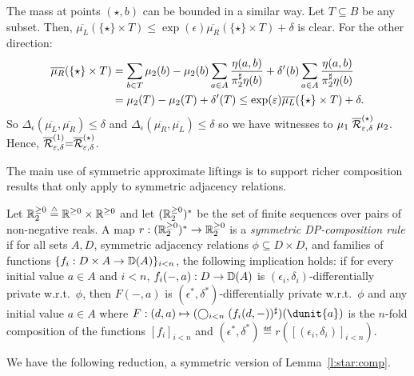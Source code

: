 \documentclass{lmcs}
\begin{document}
  The mass at points $(\star, b)$ can be bounded in a similar way. Let $T
  \subseteq B$ be any subset. Then, $\overline{\mu_L}(\{ \star \} \times T) \leq
  \exp(\epsilon) \overline{\mu_R}(\{ \star \} \times T) + \delta$ is clear. For
  the other direction:
  \begin{align*}
    \overline{\mu_R}(\{ \star \} \times T) &= \sum_{b \in T} \mu_2(b)
    - \mu_2(b) \sum_{a \in A} \frac{\eta(a, b)}{\pi_{2}^{\sharp} \eta(b)}
    + \delta'(b) \sum_{a \in A} \frac{\eta(a, b)}{\pi_{2}^{\sharp} \eta(b)} \\
    &= \mu_2(T) - \mu_2(T) + \delta'(T)
    \leq \exp(\varepsilon) \overline{\mu_L}(\{ \star \} \times T) + \delta .
  \end{align*}
  So $\Delta_{\epsilon}(\overline{\mu_L},\overline{\mu_R}) \leq \delta$ and
  $\Delta_{\epsilon}(\overline{\mu_R},\overline{\mu_L}) \leq \delta$ so we have
  witnesses to $\mu_1 \mathrel{\overline{\mathrel{\mathcal{R}}}^{(\star)}_{\varepsilon, \delta}} \mu_2$. Hence,
  $\mathrel{\overline{\mathrel{\mathcal{R}}}^{(1)}_{\varepsilon, \delta}} = \mathrel{\overline{\mathrel{\mathcal{R}}}^{(\star)}_{\varepsilon, \delta}}$.
\endproofatend

The main use of symmetric approximate liftings is to support richer composition
results that only apply to symmetric adjacency relations.

\begin{defi} \label{d:sym:comp:rule}
  Let $\mathbb{R}^{\geq 0}_2 \mathrel{\stackrel{\scriptscriptstyle \triangle}{=}} \mathbb{R}^{\geq 0} \times \mathbb{R}^{\geq 0}$ and let
  $(\mathbb{R}^{\geq 0}_2)^*$ be the set of finite sequences over pairs of non-negative
  reals. A map $r : (\mathbb{R}^{\geq 0}_2)^* \to \mathbb{R}^{\geq 0}_2$ is a
  \emph{symmetric DP-composition rule} if for all sets $A, D$, symmetric adjacency relations $\phi
  \subseteq D \times D$, and families of functions $\{ f_i : D \times A \to
  {\mathbb{D}}(A) \}_{i < n}$, the following implication holds: if for every initial
  value $a \in A$ and $i < n$, $f_i(-,a) : D \to {\mathbb{D}}(A)$ is $(\epsilon_i,
  \delta_i)$-differentially private w.r.t.\ $\phi$, then $F(-,a)$ is
  $(\epsilon^*, \delta^*)$-differentially private w.r.t.\ $\phi$ and any initial
  value $a \in A$ where \mbox{$F : (d, a) \mapsto ( \bigcirc_{i < n}
  \lift{(f_i(d,-))})(\dunit{a})$} is the $n$-fold composition of the functions
  $[f_i]_{i<n}$ and $(\epsilon^*, \delta^*) \eqdef r([(\epsilon_i, \delta_i)]_{i
  < n})$.
\end{defi}

We have the following reduction, a symmetric version of Lemma~\ref{l:star:comp}.
\end{document}
